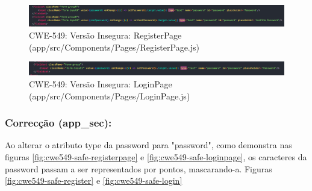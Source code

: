 \begin{figure}[H]
  \centering
  \includegraphics[width=16cm]{images/CWE549-unsafe-RegisterPage.png}
  \caption{CWE-549: Versão Insegura: RegisterPage (app/src/Components/Pages/RegisterPage.js)}
  \label{fig:cwe549-unsafe-registerpage}
\end{figure}

\begin{figure}[H]
  \centering
  \includegraphics[width=16cm]{images/CWE549-unsafe-LoginPage.png}
  \caption{CWE-549: Versão Insegura: LoginPage (app/src/Components/Pages/LoginPage.js)}
  \label{fig:cwe549-unsafe-loginpage}
\end{figure}
\subsubsection{Correcção (app\_sec):}
Ao alterar o atributo type da password para "password", como demonstra nas figuras \ref{fig:cwe549-safe-registerpage} e \ref{fig:cwe549-safe-loginpage}, os caracteres da password passam a ser representados por pontos, mascarando-a. Figuras \ref{fig:cwe549-safe-register} e \ref{fig:cwe549-safe-login}

